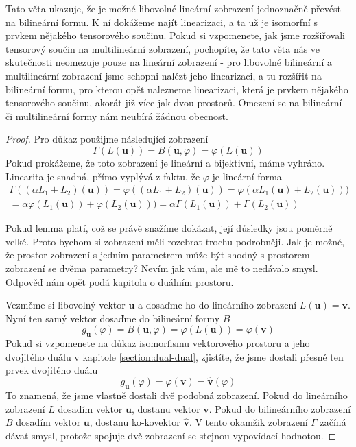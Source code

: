 \documentclass[a5paper,12pt]{amsbook}
\theoremstyle{definition}
\newcommand{\myvec}[1]{\mathbf{#1}}
\newcommand{\mycocovec}[1]{\myvec{\widehat{#1}}}
\begin{document}
Tato věta ukazuje, že je možné libovolné lineární zobrazení jednoznačně převést na bilineární formu.
K ní dokážeme najít linearizaci, a ta už je isomorfní s prvkem nějakého tensorového součinu. Pokud
si vzpomenete, jak jsme rozšiřovali tensorový součin na multilineární zobrazení, pochopíte, že
tato věta nás ve skutečnosti neomezuje pouze na lineární zobrazení - pro libovolné bilineární a
multilineární zobrazení jsme schopni nalézt jeho linearizaci, a tu rozšířit na bilineární formu,
pro kterou opět nalezneme linearizaci, která je prvkem nějakého tensorového součinu, akorát již
více jak dvou prostorů. Omezení se na bilineární či multilineární formy nám neubírá žádnou obecnost.

\begin{proof}
Pro důkaz použijme následující zobrazení
\begin{equation*}
\Gamma(L(\myvec{u})) = B(\myvec{u}, \varphi) = \varphi(L(\myvec{u}))
\end{equation*}
Pokud prokážeme, že toto zobrazení je lineární a bijektivní, máme vyhráno.
Linearita je snadná, přímo vyplývá z faktu, že $\varphi$ je lineární forma
\begin{equation*}
\begin{split}
\Gamma((\alpha L_1 + L_2)(\myvec{u})) = \varphi((\alpha L_1 + L_2)(\myvec{u}))
  = \varphi(\alpha L_1(\myvec{u}) + L_2(\myvec{u}))) \\
  = \alpha\varphi(L_1(\myvec{u})) + \varphi(L_2(\myvec{u})))
  = \alpha\Gamma(L_1(\myvec{u})) + \Gamma(L_2(\myvec{u}))
\end{split}
\end{equation*}

Pokud lemma platí, což se právě snažíme dokázat, její důsledky jsou poměrně velké. Proto bychom
si zobrazení měli rozebrat trochu podrobněji. Jak je možné, že prostor zobrazení s jedním
parametrem může být shodný s prostorem zobrazení se dvěma parametry? Nevím jak vám, ale mě
to nedávalo smysl. Odpověď nám opět podá kapitola o duálním prostoru.

Vezměme si libovolný vektor $\myvec{u}$ a dosaďme ho do lineárního zobrazení $L(\myvec{u}) = \myvec{v}$.
Nyní ten samý vektor dosaďme do bilineární formy $B$
\begin{equation*}
g_{\myvec{u}}(\varphi) = B(\myvec{u}, \varphi) = \varphi(L(\myvec{u})) = \varphi(\myvec{v})
\end{equation*}
Pokud si vzpomenete na důkaz isomorfismu vektorového prostoru a jeho dvojitého duálu v kapitole
\ref{section:dual-dual}, zjistíte, že jsme dostali přesně ten prvek dvojitého duálu
\begin{equation*}
g_{\myvec{u}}(\varphi) = \varphi(\myvec{v}) = \mycocovec{v}(\varphi)
\end{equation*}
To znamená, že jsme vlastně dostali dvě podobná zobrazení. Pokud do lineárního zobrazení
$L$ dosadím vektor $\myvec{u}$, dostanu vektor $\myvec{v}$. Pokud do bilineárního zobrazení
$B$ dosadím vektor $\myvec{u}$, dostanu ko-kovektor $\mycocovec{v}$. V tento okamžik zobrazení
$\Gamma$ začíná dávat smysl, protože spojuje dvě zobrazení se stejnou vypovídací hodnotou.


\end{proof}
\end{document}

